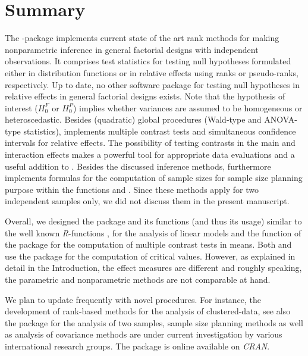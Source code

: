 \section{Summary} \label{sec:summary}
The -package implements current state of the art rank methods for making nonparametric
inference in general factorial designs with independent observations. It comprises test statistics for testing null hypotheses formulated either in distribution functions
or in relative effects using ranks or  pseudo-ranks, respectively. Up to date, no other software package for testing null hypotheses in relative effects in general factorial designs exists. Note that the hypothesis of interest ($H_0^F$ or $H_0^P$) implies whether variances are assumed to be homogeneous or heteroscedastic. Besides (quadratic) global procedures (Wald-type and ANOVA-type statistics),  implements multiple contrast tests and simultaneous confidence intervals for relative effects. The possibility of testing contrasts in the main and interaction effects makes  a powerful tool for appropriate data evaluations and a useful addition to  \citep{konietschke2015nparcomp}. Besides the discussed inference methods,  furthermore implements formulas for the computation of sample sizes for sample size planning purpose within the functions  and  \citep{happ2019optimal}. Since these methods apply for two independent samples only, we did not discuss them in the present manuscript. %

Overall, we designed the package and its functions (and thus its usage) similar to the well known \textit{R}-functions ,  for the analysis of linear models and the  function of the  package for the computation of multiple contrast tests in means. Both  and  use the  package \citep{genz2021package} for the computation of critical values. However, as explained in detail in the Introduction, the effect measures are different and roughly speaking, the parametric and nonparametric methods are not comparable at hand. 

  
We plan to update  frequently with novel procedures. For instance, the development of rank-based methods 
for the analysis of clustered-data, see also the package  \cite{jiang2017wilcoxon} for the analysis of two samples, 
sample size planning methods as well as analysis of covariance methods are under current investigation by various international research groups.  The package  is online available
on \textit{CRAN}. 

